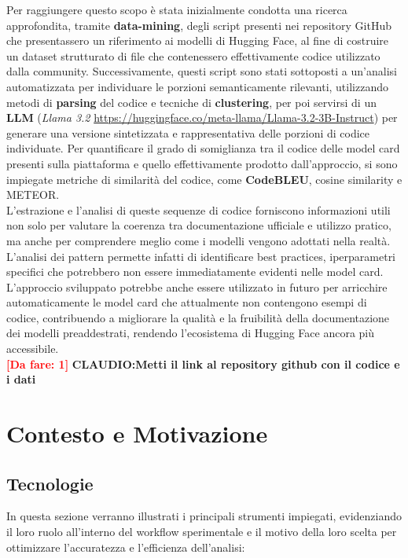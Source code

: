 \documentclass{article}
\newcommand{\dafare}[1]{\textbf{\textcolor{red}{[Da fare: #1]}}}
\begin{document}
Per raggiungere questo scopo è stata inizialmente condotta una ricerca approfondita, tramite \textbf{data-mining}, degli script presenti nei repository GitHub che presentassero un riferimento ai modelli di Hugging Face, al fine di costruire un dataset strutturato di file che contenessero effettivamente codice utilizzato dalla community. Successivamente, questi script sono stati sottoposti a un’analisi automatizzata per individuare le porzioni semanticamente rilevanti, utilizzando metodi di \textbf{parsing} del codice e tecniche di \textbf{clustering}, per poi servirsi di un \textbf{LLM} (\textit{Llama 3.2} \url{https://huggingface.co/meta-llama/Llama-3.2-3B-Instruct})  per generare una versione sintetizzata e rappresentativa delle porzioni di codice individuate. Per quantificare il grado di somiglianza tra il codice delle model card presenti sulla piattaforma e quello effettivamente prodotto dall'approccio, si sono impiegate metriche di similarità del codice, come \textbf{CodeBLEU}, cosine similarity e METEOR.\\
L’estrazione e l’analisi di queste sequenze di codice forniscono informazioni utili non solo per valutare la coerenza tra documentazione ufficiale e utilizzo pratico, ma anche per comprendere meglio come i modelli vengono adottati nella realtà. L’analisi dei pattern permette infatti di identificare best practices, iperparametri specifici che potrebbero non essere immediatamente evidenti nelle model card.\\
L’approccio sviluppato potrebbe anche essere utilizzato in futuro per arricchire automaticamente le model card che attualmente non contengono esempi di codice, contribuendo a migliorare la qualità e la fruibilità della documentazione dei modelli preaddestrati, rendendo l’ecosistema di Hugging Face ancora più accessibile.\\

\dafare{1}
\textbf{CLAUDIO:Metti il link al repository github con il codice e i dati}

\section{Contesto e Motivazione}
\subsection{Tecnologie}
In questa sezione verranno illustrati i principali strumenti impiegati, evidenziando il loro ruolo all'interno del workflow sperimentale e il motivo della loro scelta per ottimizzare l'accuratezza e l'efficienza dell’analisi:
\end{document}
